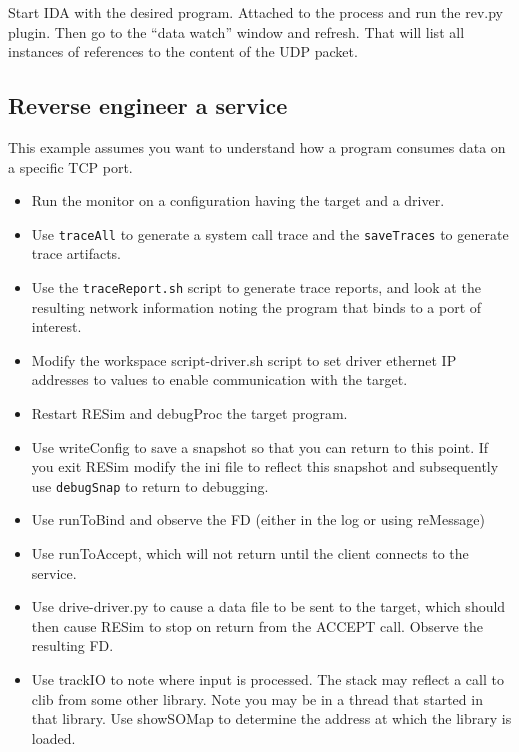 \documentclass[titlepage]{article}
\begin{document}
Start IDA with the desired program.  Attached to the process and run the rev.py plugin.  Then go to the ``data watch'' window and
refresh.  That will list all instances of references to the content of the UDP packet. 

\subsection{Reverse engineer a service}
This example assumes you want to understand how a program consumes
data on a specific TCP port.

\begin{itemize}
\item Run the monitor on a configuration having the target and a driver.

\item Use {\tt traceAll} to generate a system call trace and the {\tt saveTraces} to generate
trace artifacts.

\item Use the {\tt traceReport.sh} script to generate trace reports,
and look at the resulting network information noting the
program that binds to a port of interest.

\item Modify the workspace script-driver.sh script to set
driver ethernet IP addresses to values to enable communication
with the target.

\item Restart RESim and debugProc the target program. 

\item Use writeConfig to save a snapshot so that you can return to this point.
If you exit RESim modify the ini file to reflect this snapshot and subsequently
use {\tt debugSnap} to return to debugging.

\item Use runToBind and observe the FD (either in the log
or using reMessage)

\item Use runToAccept, which will not return until the client
connects to the service.  

\item Use drive-driver.py to cause a data file to be sent to the target, which 
should then cause RESim to stop on return from the ACCEPT call.  Observe the resulting FD.

\item Use trackIO to note where input is processed.  The stack
may reflect a call to clib from some other library.  Note
you may be in a thread that started in that library.  Use
showSOMap to determine the address at which
the library is loaded.


\end{itemize}
\end{document}
